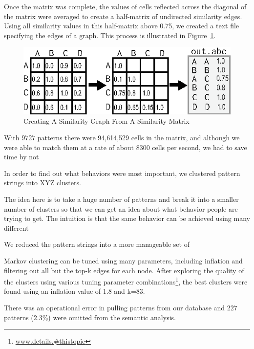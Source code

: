 Once the matrix was complete, the values of cells reflected across the diagonal of the matrix were averaged to create a half-matrix of undirected similarity edges.  Using all similarity values in this half-matrix above 0.75, we created a text file specifying the edges of a graph.  This process is illustrated in Figure~\ref{fig:matrixToGraph}.

\begin{figure}[htb]
\centering
\includegraphics[width=\columnwidth]{../illustrations/matrixToGraph.eps}
\caption{Creating A Similarity Graph From A Similarity Matrix}
\label{fig:matrixToGraph}
\end{figure}


With 9727 patterns there were 94,614,529 cells in the matrix, and although we were able to match them at a rate of about 8300 cells per second, we had to save time by not


In order to find out what behaviors were most important, we clustered  pattern strings into XYZ clusters.


The idea here is to take a huge number of patterns and break it into a smaller number of clusters so that we can get an idea about what behavior people are trying to get.  The intuition is that the same behavior can be achieved using many different



We reduced the  pattern strings into a more manageable set of

Markov clustering can be tuned using many parameters, including inflation and filtering out all but the top-k edges for each node.  After exploring the quality of the clusters using various tuning parameter combinations\footnote{\url{www.details.#thistopic}}, the best clusters were found using an inflation value of 1.8 and k=83.

There was an operational error in pulling  patterns from our database and 227 patterns (2.3\%) were omitted from the semantic analysis.

